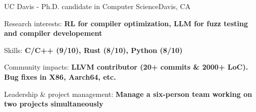 \renewcommand{\timeInterval}{\DTMdisplaydate{2019}{9}{27}{-1} - }

\ifx\lang\eng
	\begin{rSubsection}{UC Davis}{\timeInterval}{Ph.D. candidate in Computer Science}{Davis, CA}
		\item Research interests: \textbf{RL for compiler optimization, LLM for fuzz testing and compiler developement}
		\item Skills: \textbf{C/C++ (9/10), Rust (8/10), Python (8/10)}
		\item Community impacts: \textbf{LLVM contributor (20+ commits \& 2000+ LoC). Bug fixes in X86, Aarch64, etc.}
		\item Leadership \& project management: \textbf{Manage a six-person team working on two projects simultaneously}
	\end{rSubsection}
	\vspace{-0.1em}
\else
\fi

\renewcommand{\timeInterval}{}
